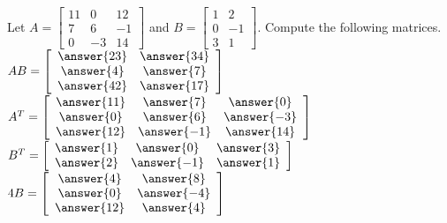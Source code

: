 \documentclass{ximera}
\begin{document}
  		
  		\begin{question} Let $A = \begin{bmatrix} 11& 0 &12\\ 7&6&-1\\ 0 &-3 &14\end{bmatrix}$ and $B = \begin{bmatrix} 1 &2\\ 0 &-1 \\ 3& 1 \end{bmatrix}$. Compute the following matrices.\\
  			
  			$AB = \left[ \begin{array}{cc} \answer{23} & \answer{34} \\ \answer{4} &\answer{7}\\ \answer{42}&\answer{17} \end{array}\right]$\\
  			
  				$A^T = \left[ \begin{array}{ccc} \answer{11} & \answer{7} & \answer{0} \\ \answer{0} &\answer{6}& \answer{-3}\\ \answer{12}&\answer{-1} & \answer{14}\end{array}\right]$\\
  			
  				$B^T = \left[ \begin{array}{ccc} \answer{1} & \answer{0}& \answer{3} \\ \answer{2} &\answer{-1} & \answer{1} \end{array}\right]$\\
  				
  				$4B = \left[\begin{array}{cc} \answer{4} & \answer{8} \\ \answer{0} &\answer{-4}\\ \answer{12}&\answer{4} \end{array}\right]$\\
  			
  			\end{question}
  		
  		
  		
  		
  
\end{document}
